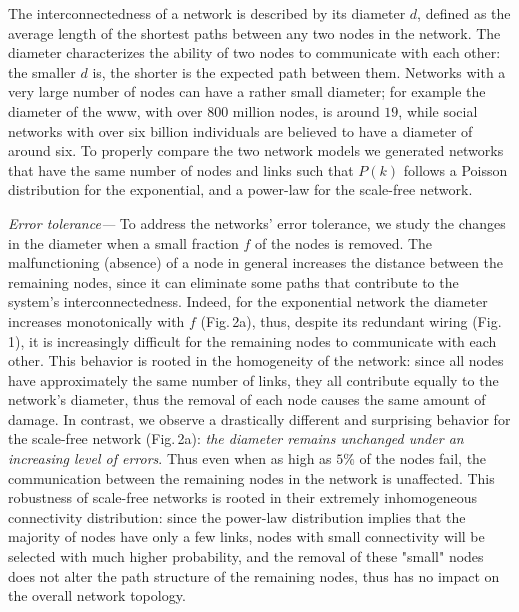 The interconnectedness of a network is described by its diameter $d$, defined as the average length of the shortest paths between any two nodes in the network. The diameter characterizes the ability  of two nodes to communicate with each other: the smaller $d$ is, the shorter is the expected path between them. Networks with a very large number of nodes can have a rather small diameter; for example the diameter of the www, with over $800$ million nodes\cite{giles}, is around $19$\cite{diam}, while social networks with over six billion individuals are believed to have a diameter of around six\cite{milgram}. To properly compare the two network models we generated networks that have the same number of nodes and links such that $P(k)$ follows a Poisson distribution for the exponential, and a power-law for the scale-free network.
 
{\it Error tolerance---} To address the networks' error tolerance, we study the changes in the diameter when a small fraction $f$ of the nodes is removed. The malfunctioning (absence) of a node  in general increases the distance between the remaining nodes, since it can eliminate some paths that contribute to the system's interconnectedness. Indeed, for the exponential network the diameter increases monotonically with $f$ (Fig.$\,$2a), thus, despite its redundant wiring (Fig.$\,$1), it is increasingly difficult for the remaining nodes to communicate with each other. This behavior is rooted in the homogeneity of the network: since all nodes have approximately the same number of links, they all contribute equally to the network's diameter, thus the removal of each node causes the same amount of damage. In contrast, we observe a drastically different and surprising behavior for the scale-free network (Fig.$\,$2a): {\it the diameter remains unchanged under an increasing level of errors}. Thus even when as high as $5\%$ of the nodes fail, the communication between the remaining nodes in the network is unaffected. This robustness of scale-free networks is rooted in their extremely inhomogeneous connectivity distribution: since the power-law distribution implies that the majority of nodes have only a few links, nodes with small connectivity will be selected with much higher probability, and the removal of these "small" nodes  does not alter the path structure of the remaining nodes, thus has no impact on the overall network topology. 

